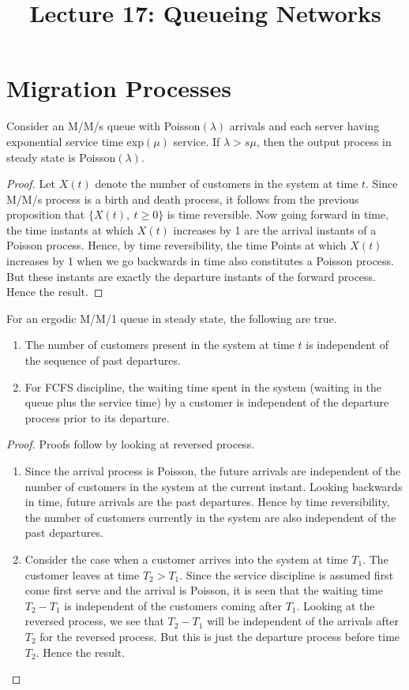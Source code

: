 \documentclass[a4paper,10pt,english]{article}
\title{Lecture 17: Queueing Networks}
\author{}
\begin{document}
\maketitle

\section{Migration Processes}

\begin{cor}
Consider an M/M/s queue with Poisson$(\lambda)$ arrivals and each server having exponential service time exp$(\mu)$ service. If $\lambda > s \mu$, then the output process in steady state is Poisson$(\lambda)$.
\end{cor}
\begin{proof}
Let $X(t)$ denote the number of customers in the system at time $t$. Since M/M/s process is a birth and death process, it follows from the previous proposition that $\{X(t),~t \geq 0\}$ is time reversible. Now going forward in time, the time instants at which $X(t)$ increases by 1 are the arrival instants of a Poisson process. Hence, by time reversibility, the time Points at which $X(t)$ increases by 1 when we go backwards in time also constitutes a Poisson process. But these instants are exactly the departure instants of the forward process. Hence the result.
\end{proof}
\begin{lem}
For an ergodic M/M/1 queue in steady state, the following are true.
\begin{enumerate}
\item The number of customers present in the system at time $t$ is independent of the sequence of past departures.
\item For FCFS discipline, the waiting time spent in the system (waiting in the queue plus the service time) by a customer is independent of the departure process prior to its departure.
\end{enumerate} 
\end{lem} 
\begin{proof}
Proofs follow by looking at reversed process.
\begin{enumerate}
\item Since the arrival process is Poisson, the future arrivals are independent of the number of customers in the system at the current instant. Looking backwards in time, future arrivals are the past departures. Hence by time reversibility, the number of customers currently in the system are also independent of the past departures.
\item Consider the case when a customer arrives into the system at time $T_1$. The customer leaves at time $T_2>T_1$.  Since the service discipline is assumed first come first serve and the arrival is Poisson, it is seen that the waiting time $T_2-T_1$ is independent of the customers coming after $T_1$. Looking at the reversed process, we see that $T_2-T_1$  will be independent of the arrivals after $T_2$ for the reversed process. But this is just the departure process before time $T_2$. Hence the result.
\end{enumerate}
\end{proof}
\end{document}
